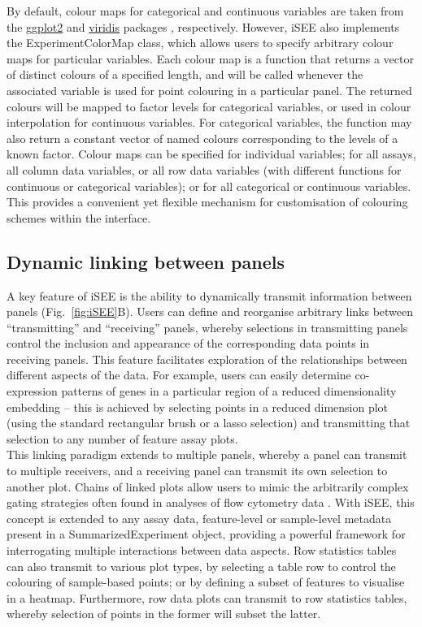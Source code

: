 \documentclass[10pt,a4paper,twocolumn]{article}
\begin{document}
By default, colour maps for categorical and continuous variables are taken from the \href{http://ggplot2.tidyverse.org/}{ggplot2}  \citep{wickham2009ggplot2} and \href{https://cran.r-project.org/web/packages/viridis/vignettes/intro-to-viridis.html}{viridis} packages \citep{garnier2018viridis}, respectively.
However, iSEE also implements the ExperimentColorMap class, which allows users to specify arbitrary colour maps for particular variables.
Each colour map is a function that returns a vector of distinct colours of a specified length, and will be called whenever the associated variable is used for point colouring in a particular panel.
The returned colours will be mapped to factor levels for categorical variables, or used in colour interpolation for continuous variables.
For categorical variables, the function may also return a constant vector of named colours corresponding to the levels of a known factor.
Colour maps can be specified for individual variables; for all assays, all column data variables, or all row data variables (with different functions for continuous or categorical variables); or for all categorical or continuous variables.
This provides a convenient yet flexible mechanism for customisation of colouring schemes within the interface.

\subsection*{Dynamic linking between panels}
A key feature of iSEE is the ability to dynamically transmit information between panels (Fig.~\ref{fig:iSEE}B).
Users can define and reorganise arbitrary links between ``transmitting'' and ``receiving'' panels, whereby selections in transmitting panels control the inclusion and appearance of the corresponding data points in receiving panels.
This feature facilitates exploration of the relationships between different aspects of the data.
For example, users can easily determine co-expression patterns of genes in a particular region of a reduced dimensionality embedding -- this is achieved by selecting points in a reduced dimension plot (using the standard rectangular brush or a lasso selection) and transmitting that selection to any number of feature assay plots.\\

This linking paradigm extends to multiple panels, whereby a panel can transmit to multiple receivers, and a receiving panel can transmit its own selection to another plot.
Chains of linked plots allow users to mimic the arbitrarily complex gating strategies often found in analyses of flow cytometry data \citep{finak2014opencyto}.
With iSEE, this concept is extended to any assay data, feature-level or sample-level metadata present in a SummarizedExperiment object, providing a powerful framework for interrogating multiple interactions between data aspects.
Row statistics tables can also transmit to various plot types, by selecting a table row to control the colouring of sample-based points;
or by defining a subset of features to visualise in a heatmap.
Furthermore, row data plots can transmit to row statistics tables, whereby selection of points in the former will subset the latter.
\end{document}
